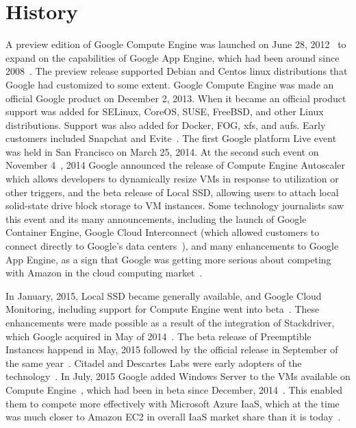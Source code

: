 \section{History}
A preview edition of Google Compute Engine was launched on June 28,
2012~\cite{hid-sp18-419-googleblog20120628} to expand on the
capabilities of Google App Engine, which had been around since
2008~\cite{hid-sp18-419-gcp-history-medium}. The preview release
supported Debian and Centos linux distributions that Google had
customized to some extent. Google Compute Engine was made an official
Google product on December 2, 2013. When it became an official product
support was added for SELinux, CoreOS, SUSE, FreeBSD, and other Linux
distributions. Support was also added for Docker, FOG, xfs, and
aufs. Early customers included Snapchat and
Evite~\cite{hid-sp18-419-googleblog20131202}. The first Google
platform Live event was held in San Francisco on March 25, 2014. At
the second such event on November
4~\cite{hid-sp18-419-googleblog20140812}, 2014 Google announced the
release of Compute Engine Autoscaler which allows developers to
dynamically resize VMs in response to utilization or other triggers,
and the beta release of Local SSD, allowing users to attach local
solid-state drive block storage to VM instances. Some technology
journalists saw this event and its many announcements, including the
launch of Google Container Engine, Google Cloud Interconnect (which
allowed customers to connect directly to Google's data
centers~\cite{hid-sp18-419-gcp-techcrunch-20141104}), and many
enhancements to Google App Engine, as a sign that Google was getting
more serious about competing with Amazon in the cloud computing
market~\cite{hid-sp18-419-forbes-gcp-20141104}.

In January, 2015, Local SSD became generally available, and Google
Cloud Monitoring, including support for Compute Engine went into
beta~\cite{hid-sp18-419-googleblog20150113}. These enhancements were
made possible as a result of the integration of Stackdriver, which
Google acquired in May of
2014~\cite{hid-sp18-419-googleblog20140507}. The beta release of
Preemptible Instances happend in May, 2015 followed by the official
release in September of the same
year~\cite{hid-sp18-419-venturebeat-preemptive-vms}. Citadel and
Descartes Labs were early adopters of the
technology~\cite{hid-sp18-419-googleblog20150518}. In July, 2015
Google added Windows Server to the VMs available on Compute
Engine~\cite{hid-sp18-419-googleblog20150715}, which had been in beta
since December, 2014~\cite{hid-sp18-419-googleblog20141208}. This
enabled them to compete more effectively with Microsoft Azure IaaS,
which at the time was much closer to Amazon EC2 in overall IaaS market
share than it is today~\cite{hid-sp18-419-statista-iaas-market2015}.

